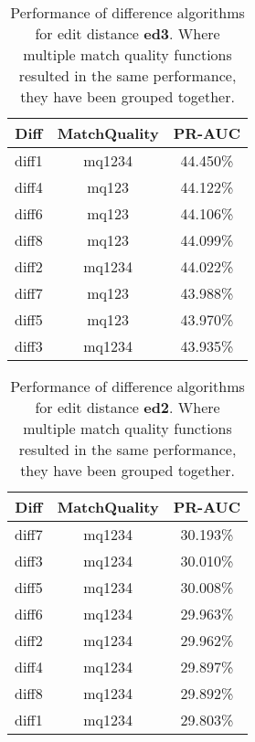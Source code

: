 \begin{table}[tbph]
\begin{center}
\begin{tabular}{|c|c||c|}
\hline
Diff & MatchQuality & PR-AUC  \\
\hline
\hline
diff1 & mq1234 & 44.450\% \\
diff4 & mq123 & 44.122\% \\
diff6 & mq123 & 44.106\% \\
diff8 & mq123 & 44.099\% \\
diff2 & mq1234 & 44.022\% \\
diff7 & mq123 & 43.988\% \\
diff5 & mq123 & 43.970\% \\
diff3 & mq1234 & 43.935\% \\
\hline
\end{tabular}
\end{center}
\caption{Performance of difference algorithms for
  edit distance \textbf{ed3}.  Where multiple match
  quality functions resulted in the same performance, they
  have been grouped together.}
\label{tab:editlongbyed3}
\end{table}
\begin{table}[tbph]
\begin{center}
\begin{tabular}{|c|c||c|}
\hline
Diff & MatchQuality & PR-AUC  \\
\hline
\hline
diff7 & mq1234 & 30.193\% \\
diff3 & mq1234 & 30.010\% \\
diff5 & mq1234 & 30.008\% \\
diff6 & mq1234 & 29.963\% \\
diff2 & mq1234 & 29.962\% \\
diff4 & mq1234 & 29.897\% \\
diff8 & mq1234 & 29.892\% \\
diff1 & mq1234 & 29.803\% \\
\hline
\end{tabular}
\end{center}
\caption{Performance of difference algorithms for
  edit distance \textbf{ed2}.  Where multiple match
  quality functions resulted in the same performance, they
  have been grouped together.}
\label{tab:editlongbyed2}
\end{table}
